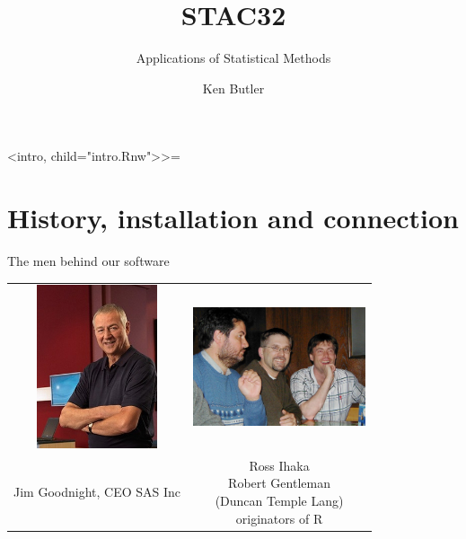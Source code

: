 \documentclass[unknownkeysallowed]{beamer}\usepackage[]{graphicx}\usepackage[]{color}
\title{STAC32}
\subtitle{Applications of Statistical Methods}
\author{Ken Butler}
\begin{document}
\maketitle




<intro, child="intro.Rnw">>=
 




\section{History, installation and connection}

\frame{\sectionpage}




\begin{frame}{The men behind our software}

  \begin{tabular}{cc}
    \includegraphics[width=1.4in]{goodnight}
    & \includegraphics[width=2in]{ihaka} \\
    Jim Goodnight, CEO SAS Inc & \pbox{10cm}{Ross Ihaka\\ Robert Gentleman\\ (Duncan
    Temple Lang)\\ originators of R}
  \end{tabular}
  
\end{frame}
\end{document}
